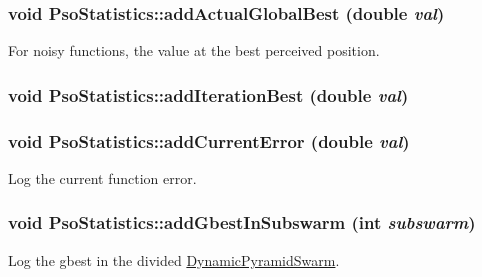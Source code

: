 \hypertarget{classPsoStatistics_22645aac349492460cb782a7c87ed3f4}{
\subsubsection{\setlength{\rightskip}{0pt plus 5cm}void PsoStatistics::addActualGlobalBest (double {\em val})}}
\label{classPsoStatistics_22645aac349492460cb782a7c87ed3f4}


For noisy functions, the value at the best perceived position. 

\hypertarget{classPsoStatistics_05194411c59d0027efa884a4cee08fd3}{
\subsubsection{\setlength{\rightskip}{0pt plus 5cm}void PsoStatistics::addIterationBest (double {\em val})}}
\label{classPsoStatistics_05194411c59d0027efa884a4cee08fd3}


\hypertarget{classPsoStatistics_1fd7ea6e68ab77ad741a0dea3a26012e}{
\subsubsection{\setlength{\rightskip}{0pt plus 5cm}void PsoStatistics::addCurrentError (double {\em val})}}
\label{classPsoStatistics_1fd7ea6e68ab77ad741a0dea3a26012e}


Log the current function error. 

\hypertarget{classPsoStatistics_3d49bfd4ef524a1e00bdc3fd60fec100}{
\subsubsection{\setlength{\rightskip}{0pt plus 5cm}void PsoStatistics::addGbestInSubswarm (int {\em subswarm})}}
\label{classPsoStatistics_3d49bfd4ef524a1e00bdc3fd60fec100}


Log the gbest in the divided \hyperlink{classDynamicPyramidSwarm}{DynamicPyramidSwarm}. 

